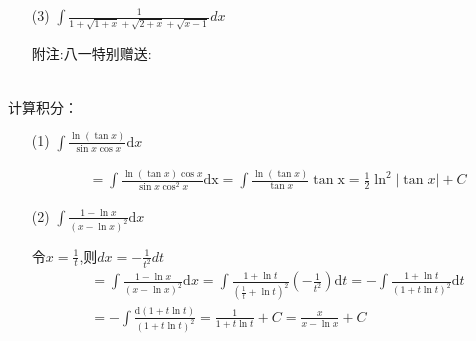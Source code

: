 \begin{xiti}
\begin{enumerate}
		\item[(3)] $\int \frac{1}{1+\sqrt{1+x}+\sqrt{2+x}+\sqrt{x-1}} d x$
		\begin{solution}
			\begin{note}
				附注:八一特别赠送:
			\end{note}
		\begin{align*}			
		\end{align*}
		\end{solution}		
		
	\end{enumerate}	


		\item 计算积分：
	\begin{enumerate}
		\item[(1)] $\int \frac { \ln ( \tan x ) } { \sin x \cos x } \mathrm { d } x$
		\begin{solution}
			\begin{align*}
			&{}=\int\frac{\ln(\tan x) \cos x}{\sin x \cos^{2} x}\mathrm{dx}=\int\frac{\ln(\tan x)}{\tan x}\mathrm{\mathrm {\tan x}}=\frac{1}{2}\ln^2|\tan x| +C
			\end{align*}
			
		\end{solution}
	
		\item[(2)]  $\int \frac { 1 - \ln x } { ( x - \ln x ) ^ { 2 } }\mathrm{d}x$
		\begin{solution}
		
		令$x=\frac{1}{t}$,则$dx=- \frac{1}{t^2}dt$\\
		
		\begin{align*}
			&=\int \frac{1-\ln x}{(x-\ln x)^{2}} \mathrm{d} x=\int \frac{1+\ln t}{\left(\frac{1}{t}+\ln t\right)^{2}}\left(-\frac{1}{t^{2}}\right) \mathrm{d} t=-\int \frac{1+\ln t}{(1+t \ln t)^{2}} \mathrm{d} t \\ 
			&=-\int \frac{\mathrm{d}(1+t \ln t)}{(1+t \ln t)^{2}}=\frac{1}{1+t \ln t}+C=\frac{x}{x-\ln x}+C
		\end{align*}
		\end{solution}
	\end{enumerate}	



\end{xiti}
